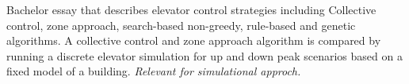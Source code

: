 

Bachelor essay that describes elevator control strategies including
Collective control, zone approach, search-based non-greedy, rule-based and genetic algorithms. A collective control and zone approach algorithm is compared by running a discrete elevator simulation for up and down peak scenarios based on a fixed model of a building. \emph{Relevant for simulational approch.}






